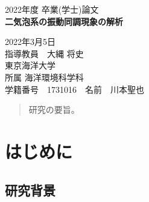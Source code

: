 \documentclass[11pt,a4j]{jreport}
\begin{document}
\thispagestyle{empty}
\begin{center}

\vspace{20mm}
{\Large\noindent 2022年度 卒業(学士)論文}\\
\vspace{50mm}
{\huge\noindent\textbf{二気泡系の振動同調現象の解析}}\\


\vspace{40mm}

{\Large\noindent
2022年3月5日\\
\vspace{\baselineskip}
指導教員　大縄 将史\\
\vspace{\baselineskip}
東京海洋大学\\
所属 海洋環境科学科\\
\vspace{\baselineskip}
学籍番号　1731016　名前　川本聖也\\
}
\vspace{40mm}

\end{center}

\thispagestyle{empty}
\clearpage

\renewcommand{\abstractname}{要旨}

\begin{abstract}
研究の要旨。
\end{abstract}


\tableofcontents

\pagestyle{fancy}
\lhead{\rightmark}
\renewcommand{\chaptermark}[1]{\markboth{第\ \normalfont\thechapter\ 章~~#1}{}}

\chapter{はじめに} %

\section{研究背景} %
\end{document}
